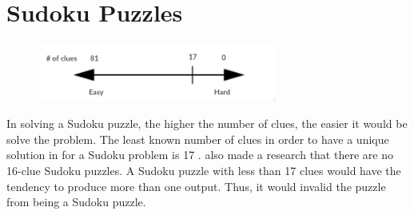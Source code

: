 \documentclass[a4paper,oneside,11pt]{report}
\begin{document}
\section{Sudoku Puzzles}
\begin{figure}[h]
  \centering
  {\includegraphics[width=0.7\textwidth]{clues.jpg}\label{fig:clues}}
\end{figure}
In solving a Sudoku puzzle, the higher the number of clues, the easier it would be solve the problem. The least known number of clues in order to have a unique solution in for a Sudoku problem is 17 \cite{Jones}. \cite{McGuire} also made a research that there are no 16-clue Sudoku puzzles. A Sudoku puzzle with less than 17 clues would have the tendency to produce more than one output. Thus, it would invalid the puzzle from being a Sudoku puzzle.\\
\end{document}
